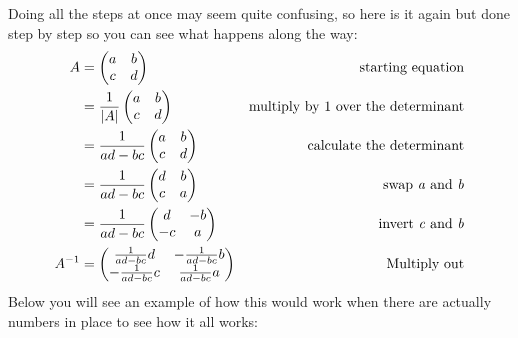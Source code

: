 \documentclass{article}
\begin{document}
Doing all the steps at once may seem quite confusing, so here is it again but done step by step so you can see what happens along the way:
\begin{align}
	A  &=
	\begin{pmatrix}
		a & b\\
		c & d
	\end{pmatrix}
	&\mbox{starting equation}
	\\
	&= \frac{1}{|A|}
	\begin{pmatrix}
		a & b\\
		c & d
	\end{pmatrix}
	&\mbox{multiply by 1 over the determinant}
	\\
	&= \frac{1}{ad-bc}
	\begin{pmatrix}
		a & b\\
		c & d
	\end{pmatrix}
	&\mbox{calculate the determinant}
	\\
	&= \frac{1}{ad-bc}
	\begin{pmatrix}
		d & b\\
		c & a
	\end{pmatrix}
	&\mbox{swap \textit{a} and \textit{b}}
	\\
	&= \frac{1}{ad-bc}
	\begin{pmatrix}
		d & -b\\
		-c & a
	\end{pmatrix}
	&\mbox{invert \textit{c} and \textit{b}}
	\\
	A^{-1}&=
	\begin{pmatrix}
		\frac{1}{ad-bc}d & -\frac{1}{ad-bc}b\\
		-\frac{1}{ad-bc}c & \frac{1}{ad-bc}a
	\end{pmatrix}
	&\mbox{Multiply out}
\end{align}
Below you will see an example of how this would work when there are actually numbers in place to see how it all works:
\end{document}
